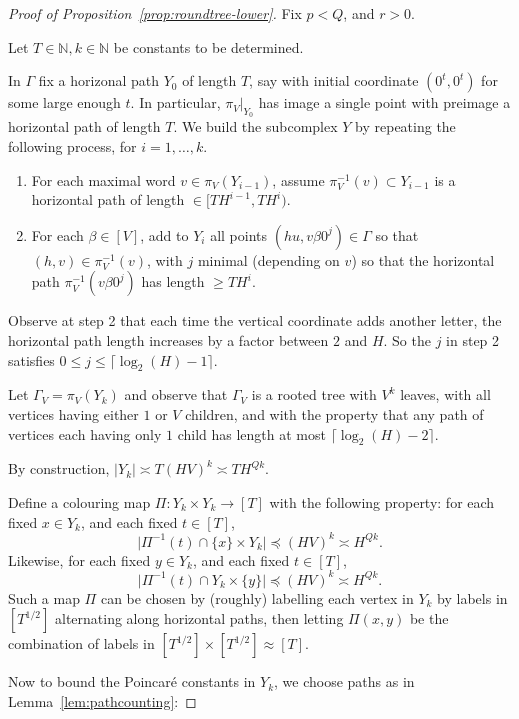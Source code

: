 \documentclass[11pt]{amsart}
\numberwithin{equation}{section}
\theoremstyle{citing}
\newcommand{\N}{\mathbb{N}}
\numberwithin{equation}{section}
\begin{document}
 
\begin{proof}[Proof of Proposition~\ref{prop:roundtree-lower}]
	Fix $p<Q$, and $r>0$.  

	Let $T \in \N, k \in \N$ be constants to be determined.
	
	In $\Gamma$ fix a horizonal path $Y_0$ of length $T$, say with initial coordinate $(0^t,0^t)$ for some large enough $t$.  In particular, $\pi_V|_{Y_0}$ has image a single point with preimage a horizontal path of length $T$.
	We build the subcomplex $Y$ by repeating the following process, for $i=1, \ldots, k$.
	\begin{enumerate}
		\item For each maximal word $v \in \pi_V(Y_{i-1})$, assume $\pi_V^{-1}(v) \subset Y_{i-1}$ is a horizontal path of length $\in [TH^{i-1},TH^i)$.
		\item For each $\beta \in [V]$, add to $Y_{i}$ all points $(hu,v\beta0^j) \in \Gamma$ so that $(h,v) \in \pi_V^{-1}(v)$, with $j$ minimal (depending on $v$) so that the horizontal path $\pi_V^{-1}(v\beta0^j)$ has length $\geq TH^i$.
	\end{enumerate}
	Observe at step 2 that each time the vertical coordinate adds another letter, the horizontal path length increases by a factor between $2$ and $H$.  So the $j$ in step 2 satisfies $0 \leq j \leq \lceil \log_2(H)-1 \rceil$.

	Let $\Gamma_V = \pi_V(Y_k)$ and observe that $\Gamma_V$ is a rooted tree with $V^k$ leaves, with all vertices having either $1$ or $V$ children, and with the property that any path of vertices each having only $1$ child has length at most $\lceil \log_2(H) -2 \rceil$.

	By construction, $|Y_k| \asymp T(HV)^k \asymp TH^{Qk}$.

	Define a colouring map $\Pi:Y_k \times Y_k \to [T]$ with the following property:
	for each fixed $x \in Y_k$, and each fixed $t \in [T]$, 
	\[
		\big| \Pi^{-1}(t) \cap \{x\} \times Y_k \big| \preceq (HV)^k \asymp H^{Qk}.
	\]
	Likewise, 
	for each fixed $y \in Y_k$, and each fixed $t \in [T]$, 
	\[
		\big| \Pi^{-1}(t) \cap Y_k \times \{y\} \big| \preceq (HV)^k \asymp H^{Qk}.
	\]
	Such a map $\Pi$ can be chosen by (roughly) labelling each vertex in $Y_k$ by labels in $[T^{1/2}]$ alternating along horizontal paths, then letting $\Pi(x,y)$ be the combination of labels in $[T^{1/2}]\times[T^{1/2}] \approx [T]$.

	Now to bound the Poincar\'e constants in $Y_k$, we choose paths as in Lemma~\ref{lem:pathcounting}:


\end{proof}
\end{document}
